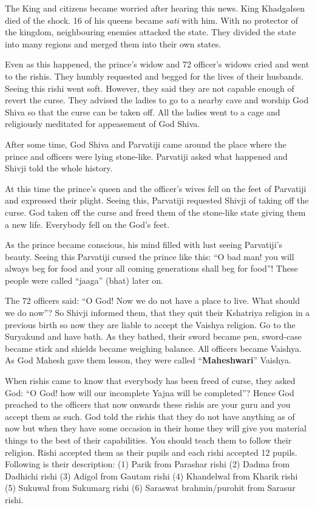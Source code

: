 The King and citizens became worried after hearing this news. King Khadgalsen died of the shock. 16 of his queens became \textit{sati} with him. With no protector of the kingdom, neighbouring enemies attacked the state. They divided the state into many regions and merged them into their own states.

Even as this happened, the prince's widow and 72 officer's widows cried and went to the rishis. They humbly requested and begged for the lives of their husbands. Seeing this rishi went soft. However, they said they are not capable enough of revert the curse. They advised the ladies to go to a nearby cave and worship God Shiva so that the curse can be taken off. All the ladies went to a cage and religiously meditated for appeasement of God Shiva.

After some time, God Shiva and Parvatiji came around the place where the prince and officers were lying stone-like. Parvatiji asked what happened and Shivji told the whole history.

At this time the prince's queen and the officer's wives fell on the feet of Parvatiji and expressed their plight. Seeing this, Parvatiji requested Shivji of taking off the curse. God taken off the curse and freed them of the stone-like state giving them a new life. Everybody fell on the God's feet.

As the prince became conscious, his mind filled with lust seeing Parvatiji's beauty. Seeing this Parvatiji cursed the prince like this: ``O bad man! you will always beg for food and your all coming generations shall beg for food''! These people were called ``jaaga'' (bhat) later on.

The 72 officers said: ``O God! Now we do not have a place to live. What should we do now''? So Shivji informed them, that they quit their Kshatriya religion in a previous birth so now they are liable to accept the Vaishya religion. Go to the Suryakund and have bath. As they bathed, their sword became pen, sword-case became stick and shields became weighing balance. All officers became Vaishya. As God Mahesh gave them lesson, they were called ``\textbf{Maheshwari}'' Vaishya.

When rishis came to know that everybody has been freed of curse, they asked God: ``O God! how will our incomplete Yajna will be completed''? Hence God preached to the officers that now onwards these rishis are your guru and you accept them as such. God told the rishis that they do not have anything as of now but when they have some occasion in their home they will give you material things to the best of their capabilities. You should teach them to follow their religion. Rishi accepted them as their pupils and each rishi accepted 12 pupils. Following is their description: 
(1) Parik from Parashar rishi (2) Dadma from Dadhichi rishi (3) Adigol from Gautam rishi (4) Khandelwal from Kharik rishi (5) Sukuwal from Sukumarg rishi (6) Saraswat brahmin/purohit from Sarasur rishi.

